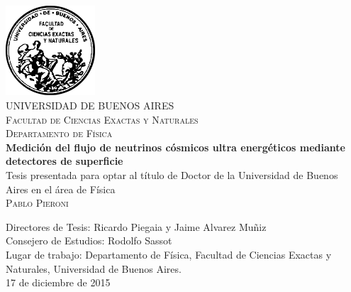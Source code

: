 \begin{titlepage}
\begin{center}


\includegraphics[width=0.25\textwidth]{fig/fceyn_logo.pdf}\\[0.5cm]    

\textsc{\large UNIVERSIDAD DE BUENOS AIRES}\\[0.5cm]

\textsc{\large Facultad de Ciencias Exactas y Naturales}\\[0.5cm]

\textsc{\large Departamento de Física }\\[2.0cm]


\textbf{\Large  Medición del flujo de neutrinos cósmicos ultra energéticos mediante detectores de superficie}\\[1.5cm]

Tesis presentada para optar al título de Doctor de la Universidad de Buenos Aires en el área de Física\\[1.0cm]

\textsc{\Large Pablo Pieroni}\\[1.0cm]

\end{center}

\vfill

\noindent
Directores de Tesis: Ricardo Piegaia y Jaime Alvarez Mu\~niz\\
Consejero de Estudios: Rodolfo Sassot\\[0.5cm]
Lugar de trabajo: Departamento de Física, Facultad de Ciencias Exactas y Naturales, Universidad de Buenos Aires.\\[0.5cm]


\noindent
{\large 17 de diciembre de 2015}

\end{titlepage}